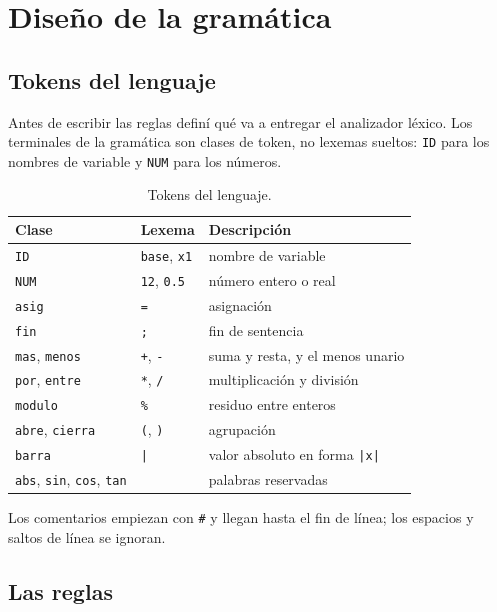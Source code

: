 \documentclass[12pt,letterpaper]{article}
\newcommand{\tk}[1]{\texttt{#1}}
\begin{document}
\section{Diseño de la gramática}

\subsection{Tokens del lenguaje}

Antes de escribir las reglas definí qué va a entregar el analizador léxico. Los terminales de la gramática son clases de token, no lexemas sueltos: \tk{ID} para los nombres de variable y \tk{NUM} para los números.

\begin{table}[H]
\centering
\caption{Tokens del lenguaje.}
\small
\begin{tabular}{lll}
\toprule
Clase & Lexema & Descripción \\
\midrule
\tk{ID} & \tk{base}, \tk{x1} & nombre de variable \\
\tk{NUM} & \tk{12}, \tk{0.5} & número entero o real \\
\tk{asig} & \tk{=} & asignación \\
\tk{fin} & \tk{;} & fin de sentencia \\
\tk{mas}, \tk{menos} & \tk{+}, \tk{-} & suma y resta, y el menos unario \\
\tk{por}, \tk{entre} & \tk{*}, \tk{/} & multiplicación y división \\
\tk{modulo} & \tk{\%} & residuo entre enteros \\
\tk{abre}, \tk{cierra} & \tk{(}, \tk{)} & agrupación \\
\tk{barra} & \tk{|} & valor absoluto en forma \tk{|x|} \\
\tk{abs}, \tk{sin}, \tk{cos}, \tk{tan} & & palabras reservadas \\
\bottomrule
\end{tabular}
\end{table}

Los comentarios empiezan con \tk{\#} y llegan hasta el fin de línea; los espacios y saltos de línea se ignoran.

\subsection{Las reglas}
\end{document}
